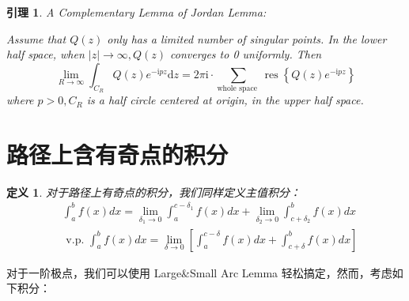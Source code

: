 \documentclass[10pt, a4paper, oneside]{ctexbook}
\newtheorem{definition}[theorem]{定义}
\newtheorem{lemma}[theorem]{引理}
\def\D{\mathrm{d}}
\begin{document}
\begin{lemma}
    A Complementary Lemma of Jordan Lemma:\rm

    Assume that $Q(z)$ only has a limited number of singular points. In the lower half space, when $|z| \rightarrow \infty, Q(z)$ converges to 0 uniformly. Then
$$\lim _{R \rightarrow \infty} \int_{C_{R}} Q(z) e^{-\mathrm{i} p z} \D z=2 \pi \mathrm{i} \cdot \sum_{\text {whole space }} \operatorname{res}\left\{Q(z) e^{-\mathrm{i} p z}\right\}$$
where $p>0, C_{R}$ is a half circle centered at origin, in the upper half space.
\end{lemma}
\section{路径上含有奇点的积分}
\begin{definition}
    对于路径上有奇点的积分，我们同样定义主值积分：
    $$
    \begin{aligned}
        &\int_{a}^{b} f(x) d x=\lim _{\delta_{1} \rightarrow 0} \int_{a}^{c-\delta_{1}} f(x) d x+\lim _{\delta_{2} \rightarrow 0} \int_{c+\delta_{2}}^{b} f(x) d x \\
        &\text { v.p. } \int_{a}^{b} f(x) d x=\lim _{\delta \rightarrow 0}\left[\int_{a}^{c-\delta} f(x) d x+\int_{c+\delta}^{b} f(x) d x\right]
    \end{aligned}
    $$
\end{definition}
对于一阶极点，我们可以使用 Large\&Small Arc Lemma 轻松搞定，然而，考虑如下积分：
\end{document}
